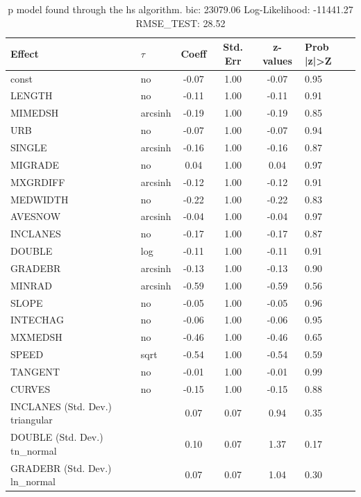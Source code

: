 \begin{table}
	\caption{p model found through the hs algorithm. bic: 23079.06 Log-Likelihood: -11441.27 RMSE_TEST: 28.52}
	\begin{center}
		\begin{tabular}{|l|l|c|c|c|l|}
			\hline
			Effect & $\tau$ & Coeff & Std. Err & z-values & Prob |z|>Z \\
			\hline
			const & no & -0.07 & 1.00 & -0.07 & 0.95 \\
			\hline
			LENGTH & no & -0.11 & 1.00 & -0.11 & 0.91 \\
			\hline
			MIMEDSH & arcsinh & -0.19 & 1.00 & -0.19 & 0.85 \\
			\hline
			URB & no & -0.07 & 1.00 & -0.07 & 0.94 \\
			\hline
			SINGLE & arcsinh & -0.16 & 1.00 & -0.16 & 0.87 \\
			\hline
			MIGRADE & no & 0.04 & 1.00 & 0.04 & 0.97 \\
			\hline
			MXGRDIFF & arcsinh & -0.12 & 1.00 & -0.12 & 0.91 \\
			\hline
			MEDWIDTH & no & -0.22 & 1.00 & -0.22 & 0.83 \\
			\hline
			AVESNOW & arcsinh & -0.04 & 1.00 & -0.04 & 0.97 \\
			\hline
			INCLANES & no & -0.17 & 1.00 & -0.17 & 0.87 \\
			\hline
			DOUBLE & log & -0.11 & 1.00 & -0.11 & 0.91 \\
			\hline
			GRADEBR & arcsinh & -0.13 & 1.00 & -0.13 & 0.90 \\
			\hline
			MINRAD & arcsinh & -0.59 & 1.00 & -0.59 & 0.56 \\
			\hline
			SLOPE & no & -0.05 & 1.00 & -0.05 & 0.96 \\
			\hline
			INTECHAG & no & -0.06 & 1.00 & -0.06 & 0.95 \\
			\hline
			MXMEDSH & no & -0.46 & 1.00 & -0.46 & 0.65 \\
			\hline
			SPEED & sqrt & -0.54 & 1.00 & -0.54 & 0.59 \\
			\hline
			TANGENT & no & -0.01 & 1.00 & -0.01 & 0.99 \\
			\hline
			CURVES & no & -0.15 & 1.00 & -0.15 & 0.88 \\
			\hline
			INCLANES (Std. Dev.) triangular &  & 0.07 & 0.07 & 0.94 & 0.35 \\
			\hline
			DOUBLE (Std. Dev.) tn_normal &  & 0.10 & 0.07 & 1.37 & 0.17 \\
			\hline
			GRADEBR (Std. Dev.) ln_normal &  & 0.07 & 0.07 & 1.04 & 0.30 \\

\end{tabular}
\end{center}
\end{table}
